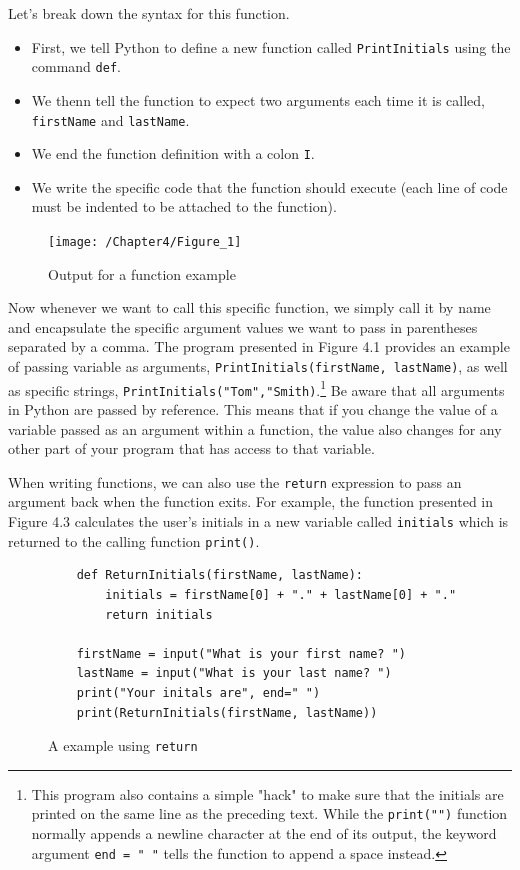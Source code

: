 \documentclass{book}
\begin{document}
Let's break down the syntax for this function.

\begin{itemize}
	\item First, we tell Python to define a new function called \texttt{PrintInitials} using the command \texttt{def}.
	\item We thenn tell the function to expect two arguments each time it is called, \texttt{firstName} and \texttt{lastName}. 
	\item We end the function definition with a colon \texttt{I}. 
	\item We write the specific code that the function should execute (each line of code must be indented to be attached to the function).
\end{itemize}

\begin{figure}[h]
	\caption{Output for a function example}
	\centering\texttt{[image: /Chapter4/Figure\_1]}
\end{figure}

Now whenever we want to call this specific function, we simply call it by name and encapsulate the specific argument values we want to pass in parentheses separated by a comma. The program presented in Figure 4.1 provides an example of passing variable as arguments, \texttt{PrintInitials(firstName, lastName)}, as well as specific strings, \texttt{PrintInitials("Tom","Smith)}.\footnote{This program also contains a simple "hack" to make sure that the initials are printed on the same line as the preceding text. While the \texttt{print("")} function normally appends a newline character at the end of its output, the keyword argument \texttt{end = " "} tells the function to append a space instead.} Be aware that all arguments in Python are passed by reference. This means that if you change the value of a variable passed as an argument within a function, the value also changes for any other part of your program that has access to that variable.

When writing functions, we can also use the \texttt{return} expression to pass an argument back when the function exits. For example, the function presented in Figure 4.3 calculates the user's initials in a new variable called \texttt{initials} which is returned to the calling function \texttt{print()}.

\begin{figure}[h]
	\caption{A example using \texttt{return}}
	\begin{lstlisting}
	def ReturnInitials(firstName, lastName):
		initials = firstName[0] + "." + lastName[0] + "."
		return initials

	firstName = input("What is your first name? ")
	lastName = input("What is your last name? ")
	print("Your initals are", end=" ")
	print(ReturnInitials(firstName, lastName))

	\end{lstlisting}
\end{figure}
\end{document}
